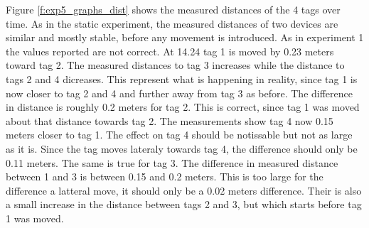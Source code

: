 Figure \ref{f:exp5_graphs_dist} shows the measured distances of the 4 tags over time.
As in the static experiment, the measured distances of two devices are similar and mostly stable, before any movement is introduced.
As in experiment 1 the values reported are not correct.
At 14.24 tag 1 is moved by 0.23 meters toward tag 2.
The measured distances to tag 3 increases while the distance to tags 2 and 4 dicreases.
This represent what is happening in reality, since tag 1 is now closer to tag 2 and 4 and further away from tag 3 as before.
The difference in distance is roughly 0.2 meters for tag 2.
This is correct, since tag 1 was moved about that distance towards tag 2.
The measurements show tag 4 now 0.15 meters closer to tag 1.
The effect on tag 4 should be notissable but not as large as it is.
Since the tag moves lateraly towards tag 4, the difference should only be 0.11 meters.
The same is true for tag 3.
The difference in measured distance between 1 and 3 is between 0.15 and 0.2 meters. 
This is too large for the difference a latteral move, it should only be a 0.02 meters difference.
Their is also a small increase in the distance between tags 2 and 3, but which starts before tag 1 was moved.



